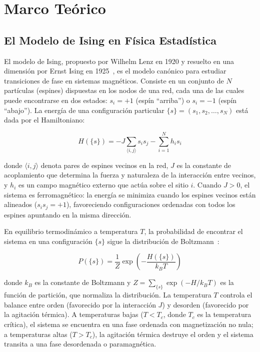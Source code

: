 \documentclass[12pt,a4paper]{article}
\begin{document}
\section{Marco Teórico}

\subsection{El Modelo de Ising en Física Estadística}

El modelo de Ising, propuesto por Wilhelm Lenz en 1920 y resuelto en una dimensión por Ernst Ising en 1925~\cite{ising1925}, es el modelo canónico para estudiar transiciones de fase en sistemas magnéticos. Consiste en un conjunto de $N$ partículas (espines) dispuestas en los nodos de una red, cada una de las cuales puede encontrarse en dos estados: $s_i = +1$ (espín ``arriba'') o $s_i = -1$ (espín ``abajo''). La energía de una configuración particular $\{s\} = (s_1, s_2, \ldots, s_N)$ está dada por el Hamiltoniano:

\begin{equation}\label{eq:hamiltoniano}
H(\{s\}) = -J \sum_{\langle i,j \rangle} s_i s_j - \sum_{i=1}^{N} h_i s_i
\end{equation}

donde $\langle i,j \rangle$ denota pares de espines vecinos en la red, $J$ es la constante de acoplamiento que determina la fuerza y naturaleza de la interacción entre vecinos, y $h_i$ es un campo magnético externo que actúa sobre el sitio $i$. Cuando $J > 0$, el sistema es ferromagnético: la energía se minimiza cuando los espines vecinos están alineados ($s_i s_j = +1$), favoreciendo configuraciones ordenadas con todos los espines apuntando en la misma dirección.

En equilibrio termodinámico a temperatura $T$, la probabilidad de encontrar el sistema en una configuración $\{s\}$ sigue la distribución de Boltzmann~\cite{onsager1944}:

\begin{equation}\label{eq:boltzmann}
P(\{s\}) = \frac{1}{Z} \exp\left(-\frac{H(\{s\})}{k_B T}\right)
\end{equation}

donde $k_B$ es la constante de Boltzmann y $Z = \sum_{\{s\}} \exp(-H/k_B T)$ es la función de partición, que normaliza la distribución. La temperatura $T$ controla el balance entre orden (favorecido por la interacción $J$) y desorden (favorecido por la agitación térmica). A temperaturas bajas ($T < T_c$, donde $T_c$ es la temperatura crítica), el sistema se encuentra en una fase ordenada con magnetización no nula; a temperaturas altas ($T > T_c$), la agitación térmica destruye el orden y el sistema transita a una fase desordenada o paramagnética.
\end{document}
